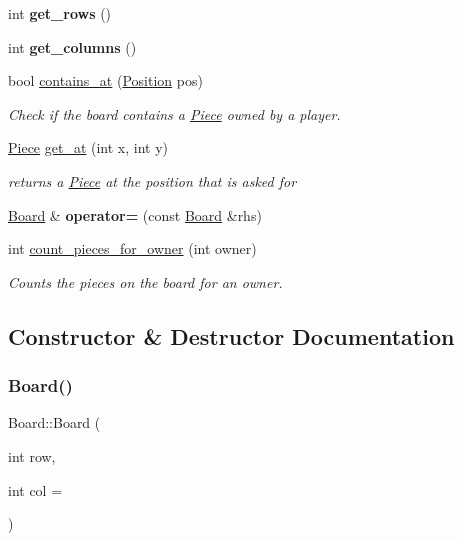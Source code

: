 \begin{DoxyCompactItemize}
int {\bfseries get\+\_\+rows} ()
\item 
\mbox{\label{class_board_a4cdc6a15ce71cf8281e7b79d758e2f6d}} 
int {\bfseries get\+\_\+columns} ()
\item 
bool \hyperlink{class_board_a727409cb7ffce590a8d0bf2fc2524285}{contains\+\_\+at} (\hyperlink{struct_position}{Position} pos)
\begin{DoxyCompactList}\small\item\em Check if the board contains a \hyperlink{class_piece}{Piece} owned by a player. \end{DoxyCompactList}\item 
\hyperlink{class_piece}{Piece} \hyperlink{class_board_a3d8816bd69742e918dff1cc1ee0fc845}{get\+\_\+at} (int x, int y)
\begin{DoxyCompactList}\small\item\em returns a \hyperlink{class_piece}{Piece} at the position that is asked for \end{DoxyCompactList}\item 
\mbox{\label{class_board_a57a4317cebaae4f6879856262cf9caae}} 
\hyperlink{class_board}{Board} \& {\bfseries operator=} (const \hyperlink{class_board}{Board} \&rhs)
\item 
int \hyperlink{class_board_a810df7b42404d5c0b5c48d7516307d8d}{count\+\_\+pieces\+\_\+for\+\_\+owner} (int owner)
\begin{DoxyCompactList}\small\item\em Counts the pieces on the board for an owner. \end{DoxyCompactList}\end{DoxyCompactItemize}


\subsection{Constructor \& Destructor Documentation}
\mbox{\label{class_board_a3ac4a0188fb538b543c0297b4d4b80f9}} 
\subsubsection{\texorpdfstring{Board()}{Board()}\hspace{0.1cm}{\footnotesize\ttfamily [1/2]}}
{\footnotesize\ttfamily Board\+::\+Board (\begin{DoxyParamCaption}\item[{int}]{row,  }\item[{int}]{col = {} }\end{DoxyParamCaption})}



